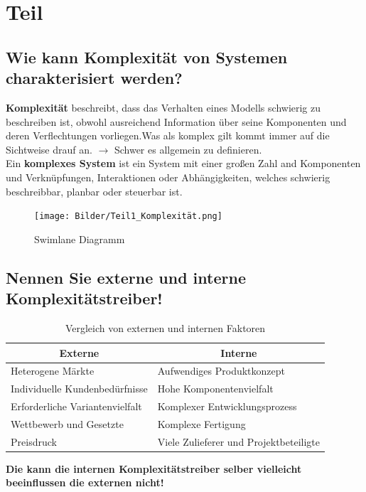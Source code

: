 \section{Teil}

\subsection{Wie kann Komplexität von Systemen charakterisiert werden?}
\textbf{Komplexität} beschreibt, dass das Verhalten eines Modells schwierig zu beschreiben ist, obwohl ausreichend Information über seine Komponenten und deren Verflechtungen vorliegen.Was als komplex gilt kommt immer auf die Sichtweise drauf an. $\rightarrow$ Schwer es allgemein zu definieren.
\\

Ein \textbf{komplexes System} ist ein System mit einer großen Zahl and Komponenten und Verknüpfungen, Interaktionen oder Abhängigkeiten, welches schwierig beschreibbar, planbar oder steuerbar ist.

\begin{figure}[H]
	\centering
	\texttt{[image: Bilder/Teil1\_Komplexität.png]}
	\caption{Swimlane Diagramm}
\end{figure}

\subsection{Nennen Sie externe und interne Komplexitätstreiber!}
	

\begin{table}[h!]
	\centering
	\begin{tabular}{|p{7cm}|p{7cm}|}
		\hline
		\multicolumn{1}{|c|}{\textbf{Externe}} & \multicolumn{1}{c|}{\textbf{Interne}} \\ \hline
		Heterogene Märkte & Aufwendiges Produktkonzept \\ \hline
		Individuelle Kundenbedürfnisse & Hohe Komponentenvielfalt \\ \hline
		Erforderliche Variantenvielfalt & Komplexer Entwicklungsprozess \\ \hline
		Wettbewerb und Gesetzte & Komplexe Fertigung \\ \hline
		Preisdruck & Viele Zulieferer und Projektbeteiligte \\ \hline
	\end{tabular}
	\caption{Vergleich von externen und internen Faktoren}
	\label{tab:extern-intern}
\end{table}
\textbf{Die kann die internen Komplexitätstreiber selber vielleicht beeinflussen die externen nicht!}

